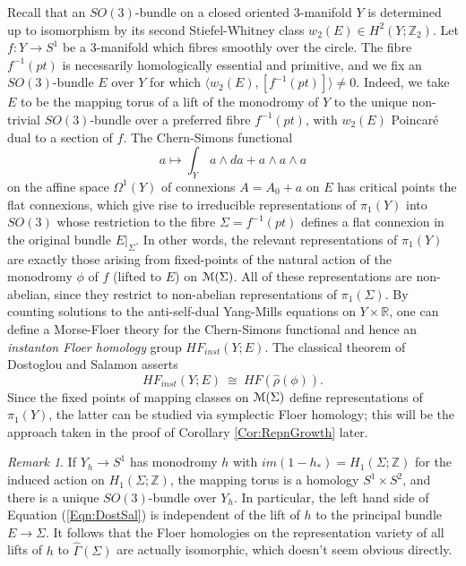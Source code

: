 \documentclass[reqno,10pt]{amsart}
\numberwithin{equation}{section}
\newcommand{\bR}{{\mathbb R}}
\newcommand{\bZ}{{\mathbb Z}}
\newcommand{\scrM}{\EuScript{M}}
\theoremstyle{remark}
\newtheorem{Remark}[thm]{Remark}
\begin{document}
Recall that an $SO(3)$-bundle on a closed oriented 3-manifold $Y$ is determined up to isomorphism by its second Stiefel-Whitney class $w_2(E) \in H^2(Y;\bZ_2)$. 
Let $f : Y\rightarrow S^1$ be a 3-manifold which fibres smoothly over the circle.  The fibre $f^{-1}(pt)$ is necessarily homologically essential and primitive, and we fix an $SO(3)$-bundle $E$ over $Y$ for which $\langle w_2(E), [f^{-1}(pt)] \rangle \neq 0$.   Indeed, we take $E$ to be the mapping torus of a lift of the monodromy of $Y$ to the unique non-trivial $SO(3)$-bundle over a preferred fibre $f^{-1}(pt)$, with  $w_2(E)$ Poincar\'e dual to a section of $f$. The Chern-Simons functional
\[
a \mapsto \int_Y \, a \wedge da + a\wedge a \wedge a
\]
on the affine space $\Omega^1(Y)$ of connexions $A = A_0 + a$ on $E$ has critical points the flat connexions, which give rise to irreducible representations of $\pi_1(Y)$ into $SO(3)$ whose restriction to the fibre $\Sigma = f^{-1}(pt)$ defines a flat connexion in the original bundle $E|_{\Sigma}$.  In other words, the relevant representations of $\pi_1(Y)$ are exactly those arising from fixed-points of the natural action of the monodromy $\phi$ of $f$ (lifted to $E$) on $\scrM(\Sigma)$.  All of these representations are non-abelian, since they restrict to non-abelian representations of $\pi_1(\Sigma)$.  By  counting solutions to the anti-self-dual Yang-Mills equations on $Y\times \bR$, one can define a Morse-Floer theory for the Chern-Simons functional and hence an \emph{instanton Floer homology} group $HF_{inst}(Y; E)$. The classical theorem of Dostoglou and Salamon \cite{DS} asserts  
\begin{equation} \label{Eqn:DostSal}
HF_{inst}(Y;E) \ \cong \ HF(\hat{\rho}(\phi)).
\end{equation}
Since the fixed points of mapping classes on $\scrM(\Sigma)$ define representations of $\pi_1(Y)$, the latter can be studied via symplectic Floer homology; this will be the approach taken in the proof of Corollary \ref{Cor:RepnGrowth} later. 

\begin{Remark}
If $Y_h \rightarrow S^1$ has monodromy $h$ with $im(1-h_*) = H_1(\Sigma;\bZ)$ for the induced action on  $H_1(\Sigma;\bZ)$, the mapping torus is a homology $S^1 \times S^2$, and there is a unique $SO(3)$-bundle over $Y_h$. In particular, the left hand side of Equation (\ref{Eqn:DostSal}) is independent of the lift of $h$ to the principal bundle $E \rightarrow \Sigma$.  It follows that the Floer homologies on the representation variety of all lifts of $h$ to $\widehat{\Gamma}(\Sigma)$ are actually isomorphic, which doesn't seem obvious directly.  \end{Remark}
\end{document}
